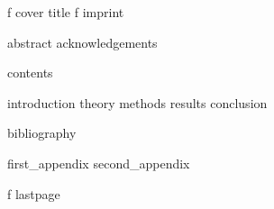 \documentclass[12pt, a4paper, twoside, openright]{report}
\begin{document}
\if\thesisStatus f
    {cover}
\fi
{}
{title}
\if\thesisStatus f
    {imprint}
\fi

{abstract}
{acknowledgements}

{contents}


{introduction}
{theory}
{methods}
{results}
{conclusion}

{bibliography}

\cleardoublepage
\appendix
{}
{first_appendix}
{second_appendix}

\if\thesisStatus f
    {lastpage}
\fi
\end{document}
